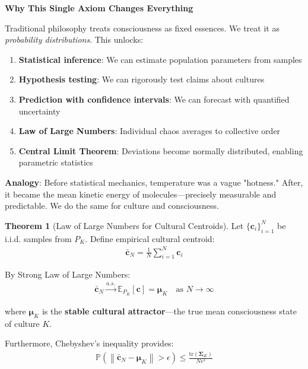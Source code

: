 \documentclass[11pt,a4paper]{article}
\theoremstyle{definition}
\newtheorem{theorem}{Theorem}[section]
\theoremstyle{remark}
\newcommand{\cc}{\mathbf{c}}
\newcommand{\norm}[1]{\left\|#1\right\|}
\begin{document}
\begin{mdframed}[backgroundcolor=yellow!10,linewidth=2pt]
\textbf{Why This Single Axiom Changes Everything}

Traditional philosophy treats consciousness as fixed essences. We treat it as \textit{probability distributions}. This unlocks:

\begin{enumerate}[nosep]
    \item \textbf{Statistical inference}: We can estimate population parameters from samples
    \item \textbf{Hypothesis testing}: We can rigorously test claims about cultures
    \item \textbf{Prediction with confidence intervals}: We can forecast with quantified uncertainty
    \item \textbf{Law of Large Numbers}: Individual chaos averages to collective order
    \item \textbf{Central Limit Theorem}: Deviations become normally distributed, enabling parametric statistics
\end{enumerate}

\textbf{Analogy}: Before statistical mechanics, temperature was a vague "hotness." After, it became the mean kinetic energy of molecules—precisely measurable and predictable. We do the same for culture and consciousness.
\end{mdframed}

\begin{theorem}[Law of Large Numbers for Cultural Centroids]
Let \(\{\cc_i\}_{i=1}^N\) be i.i.d. samples from \(P_K\). Define empirical cultural centroid:
\begin{align}
\bar{\cc}_N = \frac{1}{N} \sum_{i=1}^N \cc_i
\end{align}

By Strong Law of Large Numbers:
\begin{align}
\bar{\cc}_N \xrightarrow{a.s.} \mathbb{E}_{P_K}[\cc] = \boldsymbol{\mu}_K \quad \text{as } N \to \infty
\end{align}

where \(\boldsymbol{\mu}_K\) is the \textbf{stable cultural attractor}—the true mean consciousness state of culture \(K\).

Furthermore, Chebyshev's inequality provides:
\begin{align}
\mathbb{P}\left(\norm{\bar{\cc}_N - \boldsymbol{\mu}_K} > \epsilon\right) \leq \frac{\text{tr}(\boldsymbol{\Sigma}_K)}{N\epsilon^2}
\end{align}
\end{theorem}
\end{document}
